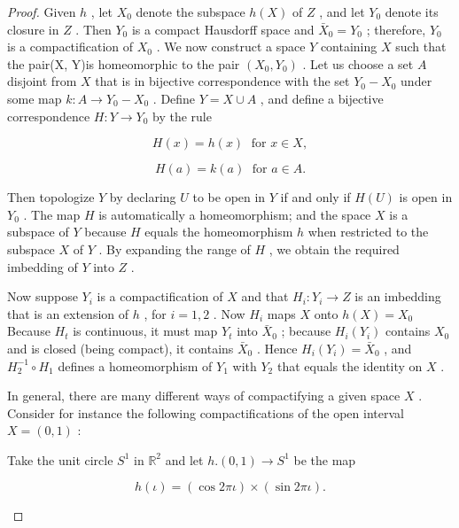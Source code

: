 \begin{proof}Given \(h\) , let \({X}_{0}\) denote the subspace \(h\left( X\right)\) of \(Z\) , and let \({Y}_{0}\) denote its closure in \(Z\) . Then \({Y}_{0}\) is a compact Hausdorff space and \({\bar{X}}_{0} = {Y}_{0}\) ; therefore, \({Y}_{0}\) is a compactification of \({X}_{0}\) .
We now construct a space \(Y\) containing \(X\) such that the pair(X, Y)is homeomorphic to the pair \(\left( {{X}_{0},{Y}_{0}}\right)\) . Let us choose a set \(A\) disjoint from \(X\) that is in bijective correspondence with the set \({Y}_{0} - {X}_{0}\) under some map \(k : A \rightarrow  {Y}_{0} - {X}_{0}\) . Define \(Y = X \cup  A\) , and define a bijective correspondence \(H : Y \rightarrow  {Y}_{0}\) by the rule

\[
H\left( x\right)  = h\left( x\right) \;\text{ for }x \in  X,
\]

\[
H\left( a\right)  = k\left( a\right) \;\text{ for }a \in  A.
\]

Then topologize \(Y\) by declaring \(U\) to be open in \(Y\) if and only if \(H\left( U\right)\) is open in \({Y}_{0}\) . The map \(H\) is automatically a homeomorphism; and the space \(X\) is a subspace of \(Y\) because \(H\) equals the homeomorphism \(h\) when restricted to the subspace \(X\) of \(Y\) . By expanding the range of \(H\) , we obtain the required imbedding of \(Y\) into \(Z\) .

Now suppose \({Y}_{i}\) is a compactification of \(X\) and that \({H}_{i} : {Y}_{i} \rightarrow  Z\) is an imbedding that is an extension of \(h\) , for \(i = 1,2\) . Now \({H}_{i}\) maps \(X\) onto \(h\left( X\right)  = {X}_{0}\) Because \({H}_{t}\) is continuous, it must map \({Y}_{t}\) into \({\bar{X}}_{0}\) ; because \({H}_{i}\left( {Y}_{i}\right)\) contains \({X}_{0}\) and is closed (being compact), it contains \({\bar{X}}_{0}\) . Hence \({H}_{i}\left( {Y}_{i}\right)  = {\bar{X}}_{0}\) , and \({H}_{2}^{-1} \circ  {H}_{1}\) defines a homeomorphism of \({Y}_{1}\) with \({Y}_{2}\) that equals the identity on \(X\) .

In general, there are many different ways of compactifying a given space \(X\) . Consider for instance the following compactifications of the open interval \(X = \left( {0,1}\right)\) :

\begin{example} Take the unit circle \({S}^{1}\) in \({\mathbb{R}}^{2}\) and let \(h.\left( {0,1}\right)  \rightarrow  {S}^{1}\) be the map

\[
h\left( \iota \right)  = \left( {\cos {2\pi \iota }}\right)  \times  \left( {\sin {2\pi \iota }}\right) .
\]


\end{example}
\end{proof}
